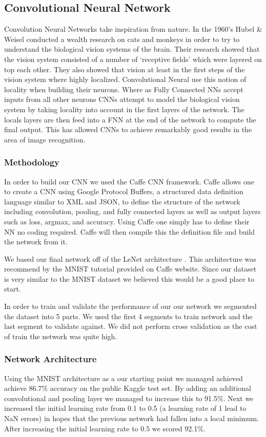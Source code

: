 \documentclass[10pt,twocolumn]{article}
\begin{document}
\subsection{Convolutional Neural Network}
Convolution Neural Networks take inspiration from nature. In the 1960's Hubel \& Weisel conducted a wealth research on cats and monkeys in order to try to understand the biological vision systems of the brain. Their research showed that the vision system consisted of a number of `receptive fields' which were layered on top each other. They also showed that vision at least in the first steps of the vision system where highly localized. Convolutional Neural use this notion of locality when building their neurons. Where as Fully Connected NNs accept inputs from all other neurons CNNs attempt to model the biological vision system by taking locality into account in the first layers of the network. The locals layers are then feed into a FNN at the end of the network to compute the final output. This has allowed CNNs to achieve remarkably good results in the area of image recognition. 
\subsubsection{Methodology}
In order to build our CNN we used the Caffe \cite{jia2014caffe} CNN framework. Caffe allows one to create a CNN using Google Protocol Buffers, a structured data definition language similar to XML and JSON, to define the structure of the network including convolution, pooling, and fully connected layers as well as output layers such as loss, argmax, and accuracy. Using Caffe one simply has to define their NN no coding required. Caffe will then compile this the definition file and build the network from it.

We based our final network off of the LeNet architecture \cite{leCunnGradient}. This architecture was recommend by the MNIST tutorial provided on Caffe website. Since our dataset is very similar to the MNIST dataset we believed this would be a good place to start. 

In order to train and validate the performance of our our network we segmented the dataset into 5 parts. We used the first 4 segments to train network and the last segment to validate against. We did not perform cross validation as the cost of train the network was quite high. 
\subsubsection{Network Architecture}
Using the MNIST architecture as a our starting point we managed achieved achieve 86.7\% accuracy on the public Kaggle test set. By adding an additional convolutional and pooling layer we managed to increase this to 91.5\%. Next we increased the initial learning rate from 0.1 to 0.5 (a learning rate of 1 lead to NaN errors) in hopes that the previous network had fallen into a local minimum. After increasing the initial learning rate to 0.5 we scored 92.1\%. 
\end{document}
